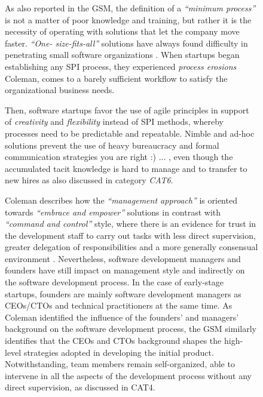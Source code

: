 \documentclass[12pt,journal,compsoc]{../sty/IEEEtran}
\begin{document}
\begin{table}[!t]
\begin{figure}[!t]
\begin{compactitem}
As also reported in the GSM, the definition of a \textit{``minimum process''}
is not a matter of poor knowledge and training, but rather it is the necessity
of operating with solutions that let the company move faster.  \textit{``One-
size-fits-all''} solutions have always found difficulty in  penetrating small
software organizations \cite{Staples2007}. When startups began  establishing any
SPI process, they experienced \textit{process erosions}   \cite{Coleman2008}
Coleman,  %
comes  %
to a barely sufficient workflow to satisfy the organizational  business needs.

Then, software startups favor the use of agile principles in support of
\textit{creativity} and \textit{flexibility} instead of SPI methods, whereby
processes need to be predictable and repeatable. Nimble and ad-hoc solutions
prevent the use of heavy bureaucracy and formal communication strategies %
you are right :) ...   , even though the accumulated tacit knowledge is hard to
manage and to transfer  to new hires as also discussed in category
\textit{CAT6}.

Coleman describes how the \textit{``management approach''} is oriented towards
\textit{``embrace and empower''} solutions in contrast with \textit{``command
and control''} style, where there is an evidence for trust in the  development
staff to carry out tasks with less direct supervision, greater delegation of
responsibilities and a more generally consensual environment \cite{Coleman2008}.
Nevertheless, software development managers and founders have still impact on
management style and indirectly on the software development process. In the case
of early-stage startups, founders are mainly software development managers as
CEOs/CTOs and  technical practitioners at the same time. As Coleman identified
the influence of the founders' and managers' background on the software
development process, the GSM similarly identifies that the CEOs and CTOs
background shapes the high-level strategies adopted in developing the initial
product. Notwithstanding, team members remain self-organized, able to intervene
in all the aspects of the development process without any direct supervision, as
discussed in CAT4.


\end{compactitem}
\end{figure}
\end{table}
\end{document}
